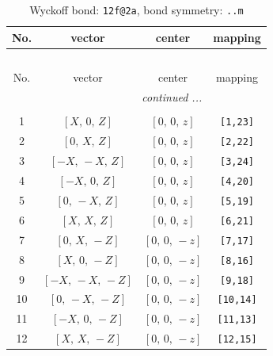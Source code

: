 \documentclass[fleqn,8pt]{jsarticle}
\begin{document}
\begin{longtable}{cccc}
\caption{Wyckoff bond: {\tt 12f@2a}, bond symmetry: {\tt ..m}}
 \\
 \hline \hline
No. & vector & center & mapping \\ \hline \endfirsthead

\multicolumn{3}{l}{\tablename\ \thetable{}} \\
 \hline \hline
No. & vector & center & mapping \\ \hline \endhead

 \hline \hline
\multicolumn{3}{r}{\footnotesize\it continued ...} \\ \endfoot

 \hline \hline
\multicolumn{3}{r}{} \\ \endlastfoot

1 & $\left[ X,\, 0,\, Z \right]$ & $\left[ 0,\, 0,\, z \right]$ & {\tt [1,23]} \\ \hline
2 & $\left[ 0,\, X,\, Z \right]$ & $\left[ 0,\, 0,\, z \right]$ & {\tt [2,22]} \\ \hline
3 & $\left[ - X,\, - X,\, Z \right]$ & $\left[ 0,\, 0,\, z \right]$ & {\tt [3,24]} \\ \hline
4 & $\left[ - X,\, 0,\, Z \right]$ & $\left[ 0,\, 0,\, z \right]$ & {\tt [4,20]} \\ \hline
5 & $\left[ 0,\, - X,\, Z \right]$ & $\left[ 0,\, 0,\, z \right]$ & {\tt [5,19]} \\ \hline
6 & $\left[ X,\, X,\, Z \right]$ & $\left[ 0,\, 0,\, z \right]$ & {\tt [6,21]} \\ \hline
7 & $\left[ 0,\, X,\, - Z \right]$ & $\left[ 0,\, 0,\, - z \right]$ & {\tt [7,17]} \\ \hline
8 & $\left[ X,\, 0,\, - Z \right]$ & $\left[ 0,\, 0,\, - z \right]$ & {\tt [8,16]} \\ \hline
9 & $\left[ - X,\, - X,\, - Z \right]$ & $\left[ 0,\, 0,\, - z \right]$ & {\tt [9,18]} \\ \hline
10 & $\left[ 0,\, - X,\, - Z \right]$ & $\left[ 0,\, 0,\, - z \right]$ & {\tt [10,14]} \\ \hline
11 & $\left[ - X,\, 0,\, - Z \right]$ & $\left[ 0,\, 0,\, - z \right]$ & {\tt [11,13]} \\ \hline
12 & $\left[ X,\, X,\, - Z \right]$ & $\left[ 0,\, 0,\, - z \right]$ & {\tt [12,15]} \\
\end{longtable}
\renewcommand{\arraystretch}{1.2}
\end{document}
